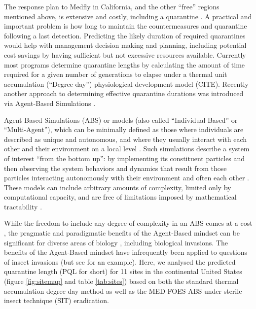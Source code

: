 \documentclass[10pt,a4paper,twocolumn]{article}
\begin{document}
The response plan to Medfly in California, and the other ``free'' regions mentioned above, is extensive and 
 costly, including a quarantine \cite{Gilbert}. A practical and important problem 
is how long to maintain the countermeasures and quarantine following a last detection. 
Predicting the likely duration of required quarantines would help with
management decision making and planning,
including potential cost savings by having sufficient but not excessive
resources available. Currently most programs determine quarantine lengths by calculating the amount of
time required for a given number of generations to elapse under a thermal unit accumulation (``Degree day'')
physiological development model (CITE). Recently another approach to determining effective quarantine 
durations was introduced via Agent-Based Simulations \cite{Manoukis2014}. 

Agent-Based
Simulations (ABS) or models (also called ``Individual-Based'' or
	``Multi-Agent''), which can be minimally defined as those where
individuals are described as unique and autonomous, and where they usually
interact with each other and their environment on a local level
\cite{Railsback2011Agent}. Such simulations describe a system of
interest ``from the bottom up'': by implementing its constituent particles and
then observing the system behaviors and dynamics that result from those
particles interacting autonomously with their environment and often each other
\cite{Bonabeau2002Agent}. These models can include arbitrary amounts of complexity, limited
only by computational capacity, and are free of limitations imposed by mathematical 
tractability \cite{Huston1988New}.

While the freedom to include any degree of complexity
in an ABS comes at a cost
\cite{Deangelis1994Individual,Grimm1999Ten,Hales2003Model}, the pragmatic and
paradigmatic benefits of the Agent-Based mindset can be significant for diverse
areas of biology \cite{Macal2010Tutorial,Railsback2011Agent}, including biological
invasions. The benefits of the Agent-Based mindset have infrequently been 
applied to
questions of insect invasions \cite{vinatier2011factors} (but see \cite{crespo2011modeling}
for an example).
Here, we analysed the predicted quarantine length (PQL for short) 
for 11 sites in the continental United States
(figure \ref{fig:sitemap} and table \ref{tab:sites})
based on both the standard thermal accumulation degree day method\cite{ECY:ECY1969503514} 
as well as the MED-FOES\cite{manoukis_computer_2014} ABS  under sterile insect technique (SIT)\cite{??} eradication.
\end{document}
